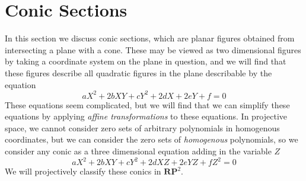 \section{Conic Sections}

In this section we discuss conic sections, which are planar figures obtained from intersecting a plane with a cone. These may be viewed as two dimensional figures by taking a coordinate system on the plane in question, and we will find that these figures describe all quadratic figures in the plane describable by the equation
%
\[ aX^2 + 2bXY + cY^2 + 2dX + 2eY + f = 0 \]
%
These equations seem complicated, but we will find that we can simplify these equations by applying {\it affine transformations} to these equations. In projective space, we cannot consider zero sets of arbitrary polynomials in homogenous coordinates, but we can consider the zero sets of {\it homogenous} polynomials, so we consider any conic as a three dimensional equation adding in the variable $Z$
%
\[ aX^2 + 2bXY + cY^2 + 2dXZ + 2eYZ + fZ^2 = 0 \]
%
We will projectively classify these conics in $\mathbf{RP}^2$.

